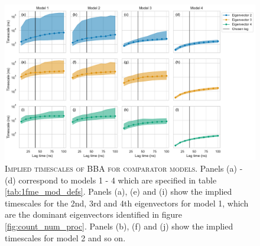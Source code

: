 \documentclass{article}
\begin{document}
\begin{figure}[h]
    \centering
    \includegraphics[width=1\textwidth]{figures/model_comparision_its/1fme.pdf}
    \caption{\textsc{Implied timescales of BBA for comparator models.} Panels (a) - (d) correspond to models 1 - 4 which are specified in table \ref{tab:1fme_mod_defs}. Panels (a), (e) and (i) show the implied timescales for the 2nd, 3rd and 4th eigenvectors for model 1, which are the dominant eigenvectors identified in figure \ref{fig:count_num_proc}.  Panels (b), (f) and (j) show the implied timescales for model 2 and so on.}
    \label{fig:1fme_its}
\end{figure}
\end{document}
